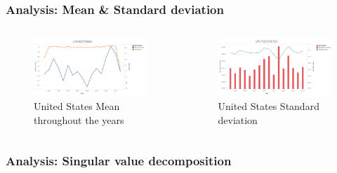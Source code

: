 \begin{frame}
\frametitle{Analysis: Mean \& Standard deviation}
\begin{columns}
\begin{figure}
    \centering
    \begin{minipage}{.75\columnwidth}
    \includegraphics[width=1.5\linewidth]{final/figures/US_mean.png}
    \caption{United States Mean throughout the years}
    \end{minipage}
\end{figure}

\begin{figure}
    \centering
    \begin{minipage}{.75\columnwidth}
    \includegraphics[width=1.25\linewidth]{final/figures/US_SD.png}
    \caption{United States Standard deviation}
    \end{minipage}
\end{figure}
\end{columns}
\end{frame}

\begin{frame}
\frametitle{Analysis: Singular value decomposition}
 
\end{frame}